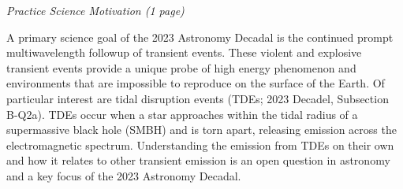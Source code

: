 \documentclass[12pt]{article}
\begin{document}
\thispagestyle{hdr}

{\it \large Practice Science Motivation (1 page)}


\indent A primary science goal of the 2023 Astronomy Decadal is the continued prompt multiwavelength followup of transient events. These violent and explosive transient events provide a unique probe of high energy phenomenon and environments that are impossible to reproduce on the surface of the Earth. Of particular interest are tidal disruption events (TDEs; 2023 Decadel, Subsection B-Q2a). TDEs occur when a star approaches within the tidal radius of a supermassive black hole (SMBH) and is torn apart, releasing emission across the electromagnetic spectrum. Understanding the emission from TDEs on their own and how it relates to other transient emission is an open question in astronomy and a key focus of the 2023 Astronomy Decadal.
\end{document}
